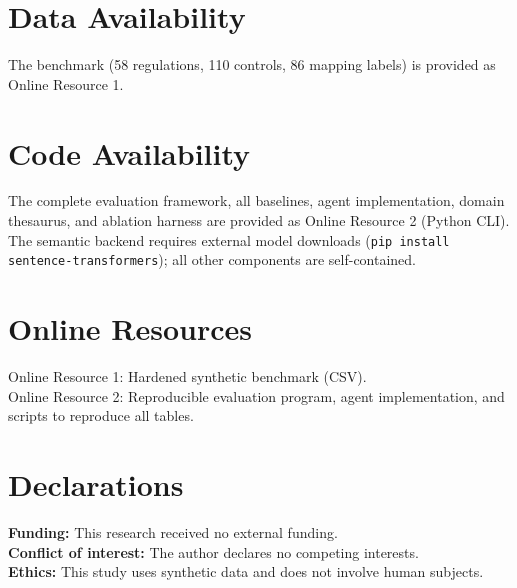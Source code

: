 \documentclass{sn-jnl}
\begin{document}
\section*{Data Availability}
The benchmark (58 regulations, 110 controls, 86 mapping labels) is provided as Online Resource 1.

\section*{Code Availability}
The complete evaluation framework, all baselines, agent implementation, domain thesaurus, and ablation harness are provided as Online Resource 2 (Python CLI).
The semantic backend requires external model downloads (\texttt{pip install sentence-transformers}); all other components are self-contained.

\section*{Online Resources}
Online Resource 1: Hardened synthetic benchmark (CSV).\\
Online Resource 2: Reproducible evaluation program, agent implementation, and scripts to reproduce all tables.

\section*{Declarations}
\textbf{Funding:} This research received no external funding.\\
\textbf{Conflict of interest:} The author declares no competing interests.\\
\textbf{Ethics:} This study uses synthetic data and does not involve human subjects.

\end{document}
